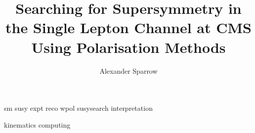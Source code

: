 \documentclass{mythesis}
\title{Searching for Supersymmetry in the Single Lepton Channel at CMS Using Polarisation Methods} \author{Alexander Sparrow}
\begin{document}


\begin{frontmatter}
  
\end{frontmatter}
\begin{mainmatter}
  \linenumbers
  {sm}
  {susy}
  {expt}
  {reco}
  {wpol}
  {susysearch}
  {interpretation}

  \nolinenumbers
\end{mainmatter}

\begin{comment}
  
  
  
  
  
  
  
\end{comment}

\begin{appendices}
  {kinematics}
  {computing}
\end{appendices}

\begin{comment}
  
  
\end{comment}

\begin{backmatter}
  
\end{backmatter}

\end{document}
